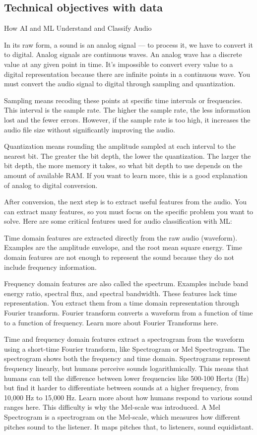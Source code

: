 \documentclass[11pt]{article}
\begin{document}
\subsection{Technical objectives with data}
{\color{blue}
  How AI and ML Understand and Classify Audio

  In its raw form, a sound is an analog signal — to process it, we have to convert it to digital. Analog signals are continuous waves. An analog wave has a discrete value at any given point in time. It’s impossible to convert every value to a digital representation because there are infinite points in a continuous wave. You must convert the audio signal to digital through sampling and quantization.

  Sampling means recoding these points at specific time intervals or frequencies. This interval is the sample rate. The higher the sample rate, the less information lost and the fewer errors. However, if the sample rate is too high, it increases the audio file size without significantly improving the audio.

  Quantization means rounding the amplitude sampled at each interval to the nearest bit. The greater the bit depth, the lower the quantization. The larger the bit depth, the more memory it takes, so what bit depth to use depends on the amount of available RAM. If you want to learn more, this is a good explanation of analog to digital conversion.

  After conversion, the next step is to extract useful features from the audio. You can extract many features, so you must focus on the specific problem you want to solve. Here are some critical features used for audio classification with ML:

  Time domain features are extracted directly from the raw audio (waveform). Examples are the amplitude envelope, and the root mean square energy. Time domain features are not enough to represent the sound because they do not include frequency information.

  Frequency domain features are also called the spectrum. Examples include band energy ratio, spectral flux, and spectral bandwidth. These features lack time representation. You extract them from a time domain representation through Fourier transform. Fourier transform converts a waveform from a function of time to a function of frequency. Learn more about Fourier Transforms here.

  Time and frequency domain features extract a spectrogram from the waveform using a short-time Fourier transform, like Spectrogram or Mel Spectrogram. The spectrogram shows both the frequency and time domain. Spectrograms represent frequency linearly, but humans perceive sounds logarithmically. This means that humans can tell the difference between lower frequencies like 500-100 Hertz (Hz) but find it harder to differentiate between sounds at a higher frequency, from 10,000 Hz to 15,000 Hz. Learn more about how humans respond to various sound ranges here. This difficulty is why the Mel-scale was introduced. A Mel Spectrogram is a spectrogram on the Mel-scale, which measures how different pitches sound to the listener. It maps pitches that, to listeners, sound equidistant.

}
\end{document}
